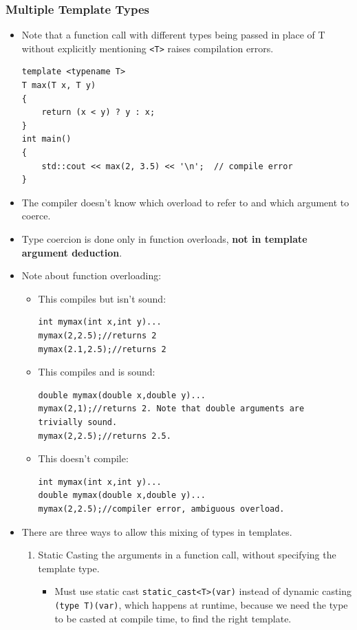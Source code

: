 \documentclass{report}
\begin{document}
\subsubsection{Multiple Template Types}
\begin{itemize}
\item Note that a function call with different types being passed in place of T without explicitly mentioning \texttt{<T>} raises compilation errors.
\begin{lstlisting}
template <typename T>
T max(T x, T y)
{
    return (x < y) ? y : x;
}
int main()
{
    std::cout << max(2, 3.5) << '\n';  // compile error
}
\end{lstlisting}
\item The compiler doesn't know which overload to refer to and which argument to coerce.
\item Type coercion is done only in function overloads, \textbf{not in template argument deduction}.
\item Note about function overloading:
\begin{itemize}
\item This compiles but isn't sound:
\begin{lstlisting}
int mymax(int x,int y)...
mymax(2,2.5);//returns 2
mymax(2.1,2.5);//returns 2
\end{lstlisting}
\item This compiles and is sound:
\begin{lstlisting}
double mymax(double x,double y)...
mymax(2,1);//returns 2. Note that double arguments are trivially sound.
mymax(2,2.5);//returns 2.5.
\end{lstlisting}
\item This doesn't compile:
\begin{lstlisting}
int mymax(int x,int y)...
double mymax(double x,double y)...
mymax(2,2.5);//compiler error, ambiguous overload.
\end{lstlisting}
\end{itemize}
\item There are three ways to allow this mixing of types in templates.
\begin{enumerate}
\item Static Casting the arguments in a function call, without specifying the template type.
\begin{itemize}
\item Must use static cast \texttt{static\_cast<T>(var)} instead of dynamic casting \texttt{(type T)(var)}, which happens at runtime, because we need the type to be casted at compile time, to find the right template.

\end{itemize}
\end{enumerate}
\end{itemize}
\end{document}
